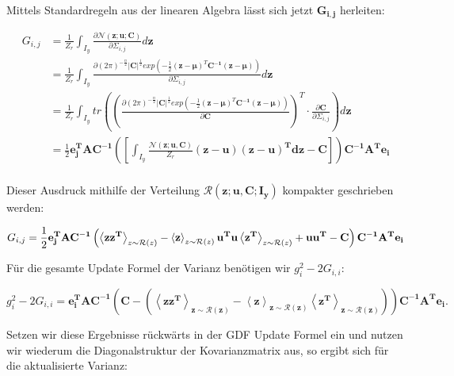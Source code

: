 \documentclass[12pt,a4paper]{scrartcl}
\numberwithin{equation}{section}
\begin{document}
 Mittels Standardregeln aus der linearen Algebra lässt sich jetzt $\mathbf{G_{i,j}}$ herleiten:
 
 \begin{equation}
  \begin{split}
   G_{i,j} &= \frac{1}{Z_r} \int_{I_y} \frac{\partial \mathcal{N}(\mathbf{z;u; C})}{\partial{\varSigma_{i,j}}} d \mathbf{z} \\
   &= \frac{1}{Z_r} \int_{I_y}  \frac{ \partial (2 \pi)^{- \frac{n}{2}} \mathbf{|C|}^{\frac{1}{2}} exp \left (- \frac{1}{2} (\mathbf{z - \mu})^T \mathbf{C^{-1}} (\mathbf{z - \mu}) \right )}{\partial \varSigma_{i,j}} d \mathbf{z} \\
   &= \frac{1}{Z_r} \int_{I_y} tr \left( \left ( \frac{ \partial (2 \pi)^{- \frac{n}{2}} \mathbf{|C|}^{\frac{1}{2}} exp \left (- \frac{1}{2} (\mathbf{z - \mu})^T \mathbf{C^{-1}} (\mathbf{z - \mu}) \right )}{\partial \mathbf{C}} \right )^T \cdot \frac{\partial \mathbf{C}}{\partial \varSigma_{i,j}} \right) d \mathbf{z} \\
   &= \frac{1}{2} \mathbf{e_j^T A C^{-1}} \left ( \left [ \int_{I_y} \frac{\mathcal{N}(\mathbf{z;u,C})}{Z_r} \mathbf{(z - u)(z-u)^T d z}- \mathbf{C} \right ] \right ) \mathbf{C^{-1} A^T e_i} \\ 
  \end{split}
 \end{equation}

 Dieser Ausdruck mithilfe der Verteilung $\mathcal{R}(\mathbf{z;u,C; I_y})$ kompakter geschrieben werden:
 
 \begin{equation}
  G_{i,j} = \frac{1}{2} \mathbf{e_j^T A C^{-1}} \left ( \left < \mathbf{z z ^T} \right >_{z \sim \mathcal{R}(z)} - \left < \mathbf{z} \right >_{z \sim \mathcal{R}(z)} \mathbf{u^T}  \mathbf{u} \left < \mathbf{z^T} \right >_{z \sim \mathcal{R}(z)} + \mathbf{u u^T - C} \right ) \mathbf{C^{-1} A^T e_i} \\
 \end{equation}

 Für die gesamte Update Formel der Varianz benötigen wir $g_i^2 - 2 G_{i,i}$: 
 
 \begin{equation}
  g_i^2 - 2 G_{i,i} = \mathbf{e_i^T A C^{-1} (C - (\left < z z^T \right >_{z \sim \mathcal{R}(z)} - \left < z \right >_{z \sim \mathcal{R}(z)} \left < z^T \right >_{z \sim \mathcal{R}(z)} )) C^{-1} A^T e_i}.
 \end{equation}

 Setzen wir diese Ergebnisse rückwärts in der GDF Update Formel ein und nutzen wir wiederum die Diagonalstruktur der Kovarianzmatrix aus, so ergibt sich für die aktualisierte Varianz:
 
\end{document}
